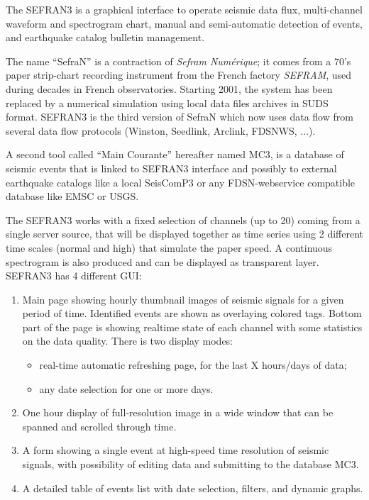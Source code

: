The SEFRAN3 is a graphical interface to operate seismic data flux, multi-channel waveform and spectrogram chart, manual and semi-automatic detection of events, and earthquake catalog bulletin management.

The name ``SefraN'' is a contraction of \textit{Sefram Numérique}; it comes from a 70's paper strip-chart recording instrument from the French factory \textit{SEFRAM\textregistered}, used during decades in French observatories. Starting 2001, the system has been replaced by a numerical simulation using local data files archives in SUDS format. SEFRAN3 is the third version of SefraN which now uses data flow from several data flow protocols (Winston, Seedlink, Arclink, FDSNWS, ...).

A second tool called ``Main Courante'' hereafter named MC3, is a database of seismic events that is linked to SEFRAN3 interface and possibly to external earthquake catalogs like a local SeisComP3 or any FDSN-webservice compatible database like EMSC or USGS.

The SEFRAN3 works with a fixed selection of channels (up to 20) coming from a single server source, that will be displayed together as time series using 2 different time scales (normal and high) that simulate the paper speed. A continuous spectrogram is also produced and can be displayed as transparent layer. SEFRAN3 has 4 different GUI:
\begin{enumerate}

\item Main page showing hourly thumbnail images of seismic signals for a given period of time. Identified events are shown as overlaying colored tags. Bottom part of the page is showing realtime state of each channel with some statistics on the data quality. There is two display modes:
\begin{itemize}
\item real-time automatic refreshing page, for the last X hours/days of data;
\item any date selection for one or more days.
\end{itemize}

\item One hour display of full-resolution image in a wide window that can be spanned and scrolled through time.

\item A form showing a single event at high-speed time resolution of seismic signals, with possibility of editing data and submitting to the database MC3.

\item A detailed table of events list with date selection, filters, and dynamic graphs.

\end{enumerate}

